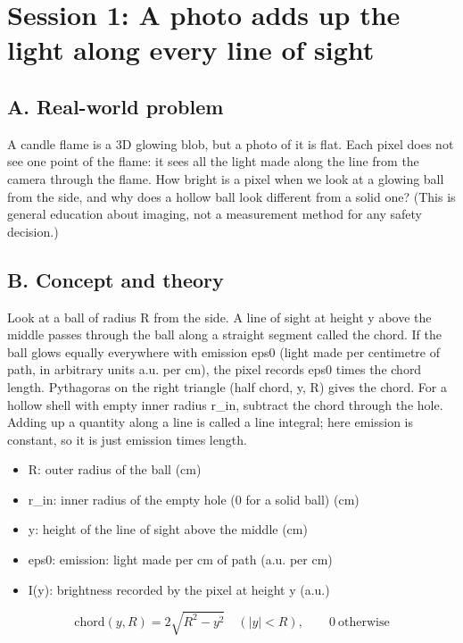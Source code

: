 \documentclass[11pt,a4paper]{article}
\begin{document}
\section{Session 1: A photo adds up the light along every line of sight}

\subsection*{A. Real-world problem}
A candle flame is a 3D glowing blob, but a photo of it is flat. Each pixel does not see one point of the flame: it sees all the light made along the line from the camera through the flame. How bright is a pixel when we look at a glowing ball from the side, and why does a hollow ball look different from a solid one? (This is general education about imaging, not a measurement method for any safety decision.)

\subsection*{B. Concept and theory}
Look at a ball of radius R from the side. A line of sight at height y above the middle passes through the ball along a straight segment called the chord. If the ball glows equally everywhere with emission eps0 (light made per centimetre of path, in arbitrary units a.u. per cm), the pixel records eps0 times the chord length. Pythagoras on the right triangle (half chord, y, R) gives the chord. For a hollow shell with empty inner radius r\_in, subtract the chord through the hole. Adding up a quantity along a line is called a line integral; here emission is constant, so it is just emission times length.

\begin{itemize}[nosep]
\item R: outer radius of the ball (cm)
\item r\_in: inner radius of the empty hole (0 for a solid ball) (cm)
\item y: height of the line of sight above the middle (cm)
\item eps0: emission: light made per cm of path (a.u. per cm)
\item I(y): brightness recorded by the pixel at height y (a.u.)
\end{itemize}

\begin{equation*}
\mathrm{chord}(y,R)=2\sqrt{R^2-y^2}\quad(|y|<R),\qquad 0\ \text{otherwise}
\end{equation*}
\end{document}

